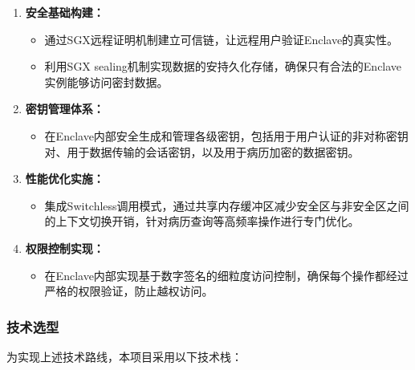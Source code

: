 \documentclass{article}
\begin{document}
\begin{enumerate}[leftmargin=*, label=\arabic*、]
  \item \textbf{安全基础构建：}
    \begin{itemize}[leftmargin=2em]
      \item 通过SGX远程证明机制建立可信链，让远程用户验证Enclave的真实性。
      \item 利用SGX sealing机制实现数据的安持久化存储，确保只有合法的Enclave实例能够访问密封数据。
    \end{itemize}

  \item \textbf{密钥管理体系：}
    \begin{itemize}[leftmargin=2em]
      \item 在Enclave内部安全生成和管理各级密钥，包括用于用户认证的非对称密钥对、用于数据传输的会话密钥，以及用于病历加密的数据密钥。
    \end{itemize}

  \item \textbf{性能优化实施：}
    \begin{itemize}[leftmargin=2em]
      \item 集成Switchless调用模式，通过共享内存缓冲区减少安全区与非安全区之间的上下文切换开销，针对病历查询等高频率操作进行专门优化。
    \end{itemize}
  
  \item \textbf{权限控制实现：}
    \begin{itemize}[leftmargin=2em]
      \item 在Enclave内部实现基于数字签名的细粒度访问控制，确保每个操作都经过严格的权限验证，防止越权访问。
    \end{itemize}
\end{enumerate}

\subsubsection*{技术选型}
\noindent 为实现上述技术路线，本项目采用以下技术栈：
\end{document}
